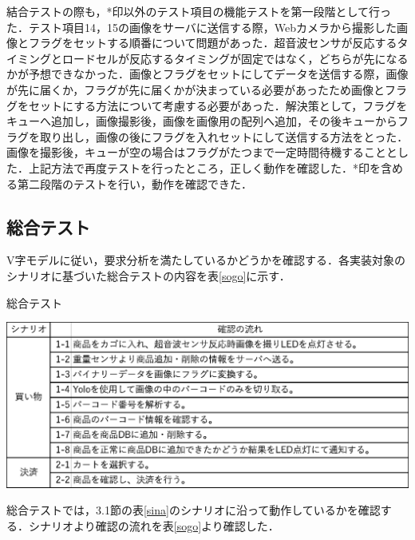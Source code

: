 結合テストの際も，*印以外のテスト項目の機能テストを第一段階として行った．テスト項目14，15の画像をサーバに送信する際，Webカメラから撮影した画像とフラグをセットする順番について問題があった．超音波センサが反応するタイミングとロードセルが反応するタイミングが固定ではなく，どちらが先になるかが予想できなかった．画像とフラグをセットにしてデータを送信する際，画像が先に届くか，フラグが先に届くかが決まっている必要があったため画像とフラグをセットにする方法について考慮する必要があった．解決策として，フラグをキューへ追加し，画像撮影後，画像を画像用の配列へ追加，その後キューからフラグを取り出し，画像の後にフラグを入れセットにして送信する方法をとった．画像を撮影後，キューが空の場合はフラグがたつまで一定時間待機することとした．上記方法で再度テストを行ったところ，正しく動作を確認した．*印を含める第二段階のテストを行い，動作を確認できた．


\subsection{総合テスト}

V字モデルに従い，要求分析を満たしているかどうかを確認する．各実装対象のシナリオに基づいた総合テストの内容を表\ref{sogo}に示す．


\begin{table}[htbp]
\centering
\caption{総合テスト}
\includegraphics[width = 15cm]{./picture/sogo.eps}
\label{sogo}
\end{table}

総合テストでは，3.1節の表\ref{sina}のシナリオに沿って動作しているかを確認する．シナリオより確認の流れを表\ref{sogo}より確認した．
